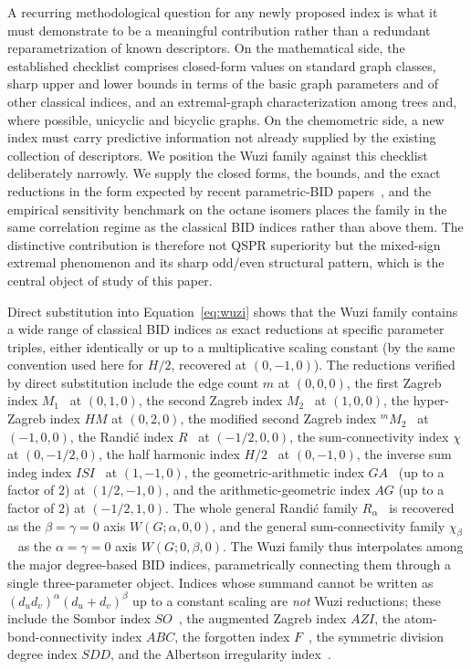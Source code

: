 \documentclass[a5paper, 10pt]{article}
\theoremstyle{plain}
\theoremstyle{remark}
\theoremstyle{definition}
\begin{document}
A recurring methodological question for any newly proposed index
is what it must demonstrate to be a meaningful contribution
rather than a redundant reparametrization of known descriptors.
On the mathematical side, the established checklist comprises
closed-form values on standard graph classes, sharp upper and
lower bounds in terms of the basic graph parameters and of other
classical indices, and an extremal-graph characterization among
trees and, where possible, unicyclic and bicyclic graphs. On the
chemometric side, a new index must carry predictive information
not already supplied by the existing collection of descriptors.
We position the Wuzi family against this checklist deliberately
narrowly. We supply the closed forms, the bounds, and the exact
reductions in the form expected by recent parametric-BID
papers~\cite{MovahediGutmanRedzepovicFurtula2026}, and the
empirical sensitivity benchmark on the octane isomers places the
family in the same correlation regime as the classical BID
indices rather than above them. The distinctive contribution is
therefore not QSPR superiority but the mixed-sign extremal
phenomenon and its sharp odd/even structural pattern, which is
the central object of study of this paper.

Direct substitution into Equation~\eqref{eq:wuzi} shows that the
Wuzi family contains a wide range of classical BID indices as
exact reductions at specific parameter triples, either
identically or up to a multiplicative scaling constant (by the
same convention used here for $H/2$, recovered at
$(0, -1, 0)$). The reductions verified by direct substitution
include the edge count $m$ at $(0, 0, 0)$, the first Zagreb
index $M_1$~\cite{Gutman1972} at $(0, 1, 0)$, the second Zagreb
index $M_2$~\cite{Gutman1972} at $(1, 0, 0)$, the hyper-Zagreb
index $HM$ at $(0, 2, 0)$, the modified second Zagreb index
${}^{m}\!M_2$~\cite{NikolicKovacevicMilicevicTrinajstic2003} at
$(-1, 0, 0)$, the Randi\'c index $R$~\cite{Randic1975} at
$(-1/2, 0, 0)$, the sum-connectivity index
$\chi$~\cite{ZhouTrinajstic2009sumconn} at $(0, -1/2, 0)$, the
half harmonic index $H/2$~\cite{Fajtlowicz1987Harmonic} at
$(0, -1, 0)$, the inverse sum indeg index
$ISI$~\cite{Vukicevic2010BondAdditive2} at $(1, -1, 0)$, the
geometric-arithmetic index
$GA$~\cite{VukicevicFurtula2009GA} (up to a factor of $2$) at
$(1/2, -1, 0)$, and the arithmetic-geometric index $AG$ (up to a
factor of $2$) at $(-1/2, 1, 0)$. The whole general Randi\'c
family $R_\alpha$~\cite{BollobasErdos1998} is recovered as the
$\beta = \gamma = 0$ axis $W(G; \alpha, 0, 0)$, and the general
sum-connectivity family
$\chi_\beta$~\cite{ZhouTrinajstic2009sumconn} as the
$\alpha = \gamma = 0$ axis $W(G; 0, \beta, 0)$. The Wuzi family
thus interpolates among the major degree-based BID indices,
parametrically connecting them through a single three-parameter
object. Indices whose summand cannot be written as
$(d_u d_v)^\alpha (d_u + d_v)^\beta$ up to a constant scaling
are \emph{not} Wuzi reductions; these include the Sombor index
$SO$~\cite{Gutman2021Sombor}, the augmented Zagreb index $AZI$,
the atom-bond-connectivity index $ABC$, the forgotten index
$F$~\cite{FurtulaGutman2015F}, the symmetric division degree
index $SDD$, and the Albertson irregularity
index~\cite{Albertson1997}.
\end{document}
